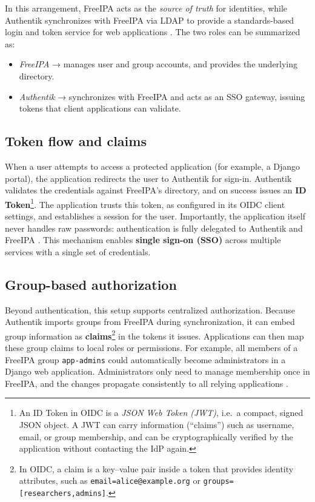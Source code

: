 In this arrangement, FreeIPA acts as the \emph{source of truth} for identities, 
while Authentik synchronizes with FreeIPA via LDAP to provide a standards-based 
login and token service for web applications 
\parencite{Authentik_Docs_LDAP,FreeIPA_Overview}. The two roles can be 
summarized as:

\begin{itemize}
	\item \emph{FreeIPA} → manages user and group accounts, and provides the 
	underlying directory.  
	\item \emph{Authentik} → synchronizes with FreeIPA and acts as an SSO gateway, 
	issuing tokens that client applications can validate.  
\end{itemize}

\subsection*{Token flow and claims}
When a user attempts to access a protected application (for example, a Django 
portal), the application redirects the user to Authentik for sign-in. 
Authentik validates the credentials against FreeIPA’s directory, and on success 
issues an \textbf{ID Token}\footnote{%
	An ID Token in OIDC is a \emph{JSON Web Token (JWT)}, i.e.\ a compact, signed 
	JSON object. A JWT can carry information (``claims'') such as username, 
	email, or group membership, and can be cryptographically verified by the 
	application without contacting the IdP again.}. The application trusts this 
token, as configured in its OIDC client settings, and establishes a session for 
the user. Importantly, the application itself never handles raw passwords: 
authentication is fully delegated to Authentik and FreeIPA 
\parencite{Authentik_Docs_OIDC,OpenIDConnectCore}. This mechanism enables 
\textbf{single sign-on (SSO)} across multiple services with a single set of 
credentials.

\subsection*{Group-based authorization}
Beyond authentication, this setup supports centralized authorization. Because 
Authentik imports groups from FreeIPA during synchronization, it can embed group 
information as \textbf{claims}\footnote{%
	In OIDC, a claim is a key--value pair inside a token that provides identity 
	attributes, such as \texttt{email=alice@example.org} or 
	\texttt{groups=[researchers,admins]}.} in the tokens it issues. Applications 
can then map these group claims to local roles or permissions. For example, all 
members of a FreeIPA group \texttt{app-admins} could automatically become 
administrators in a Django web application. Administrators only need to manage 
membership once in FreeIPA, and the changes propagate consistently to all 
relying applications \parencite{Authentik_Docs_Claims,FreeIPA_Docs}. 


